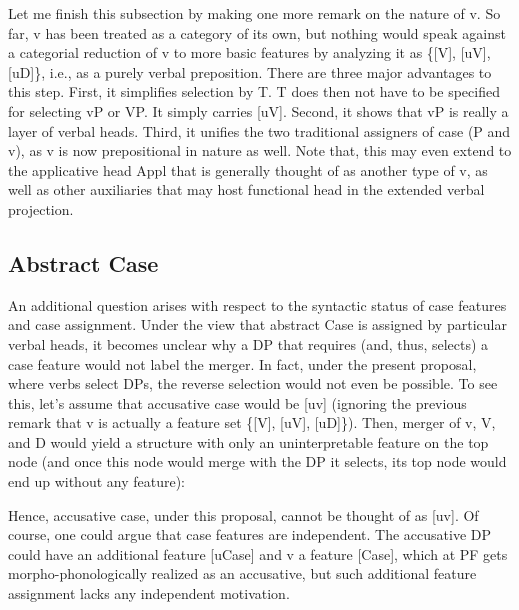 \documentclass[output=paper
,modfonts
,nonflat]{langsci/langscibook}
\begin{document}
Let me finish this subsection by making one more remark on the nature of v. So far, v has been treated as a category of its own, but nothing would speak against a categorial reduction of v to more basic features by analyzing it as \{[V], [uV], [uD]\}, i.e., as a purely verbal preposition. There are three major advantages to this step. First, it simplifies selection by T. T does then not have to be specified for selecting vP or VP. It simply carries [uV]. Second, it shows that vP is really a layer of verbal heads. Third, it unifies the two traditional assigners of case (P and v), as v is now prepositional in nature as well. Note that, this may even extend to the applicative head Appl that is generally thought of as another type of v, as well as other auxiliaries that may host functional head in the extended verbal projection.

\subsection{Abstract Case}
An additional question arises with respect to the syntactic status of case features and case assignment. Under the view that abstract Case is assigned by particular verbal heads, it becomes unclear why a DP that requires (and, thus, selects) a case feature would not label the merger. In fact, under the present proposal, where verbs select DPs, the reverse selection would not even be possible. To see this, let’s assume that accusative case would be [uv] (ignoring the previous remark that v is actually a feature set \{[V], [uV], [uD]\}). Then, merger of v, V, and D would yield a structure with only an uninterpretable feature on the top node (and once this node would merge with the DP it selects, its top node would end up without any feature):

\begin{figure}[!h]
	\begin{exe}
	\end{exe} \vspace{-0.7cm}
\end{figure}
\noindent Hence, accusative case, under this proposal, cannot be thought of as [uv]. Of course, one could argue that case features are independent. The accusative DP could have an additional feature [uCase] and v a feature [Case], which at PF gets morpho-phonologically realized as an accusative, but such additional feature assignment lacks any independent motivation.
\end{document}
